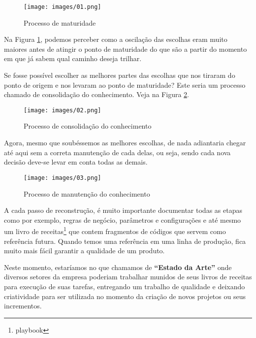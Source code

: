 \begin{figure}[H]
    \centering
    \texttt{[image: images/01.png]}
    \caption{Processo de maturidade}
    \label{pic_01}
\end{figure}

Na Figura \ref{pic_01}, podemos perceber como a oscilação das escolhas eram muito maiores antes de atingir o ponto de maturidade do que são a partir do momento em que já sabem qual caminho deseja trilhar.

Se fosse possível escolher as melhores partes das escolhas que nos tiraram do ponto de origem e nos levaram ao ponto de maturidade? Este seria um processo chamado de consolidação do conhecimento. Veja na Figura \ref{pic_02}.

\begin{figure}[H]
    \centering
    \texttt{[image: images/02.png]}
    \caption{Processo de consolidação do conhecimento}
    \label{pic_02}
\end{figure}

Agora, mesmo que soubéssemos as melhores escolhas, de nada adiantaria chegar até aqui sem a correta manutenção de cada delas, ou seja, sendo cada nova decisão deve-se levar em conta todas as demais.

\begin{figure}[H]
    \centering
    \texttt{[image: images/03.png]}
    \caption{Processo de manutenção do conhecimento}
    \label{pic_03}
\end{figure}

A cada passo de reconstrução, é muito importante documentar todas as etapas como por exemplo, regras de negócio, parâmetros e configurações e até mesmo um livro de receitas\footnote{playbook} que contem fragmentos de códigos que servem como referência futura. Quando temos uma referência em uma linha de produção, fica muito mais fácil garantir a qualidade de um produto.

Neste momento, estaríamos no que chamamos de \textbf{``Estado da Arte''} onde diversos setores da empresa poderiam trabalhar munidos de seus livros de receitas para execução de suas tarefas, entregando um trabalho de qualidade e deixando criatividade para ser utilizada no momento da criação de novos projetos ou seus incrementos.